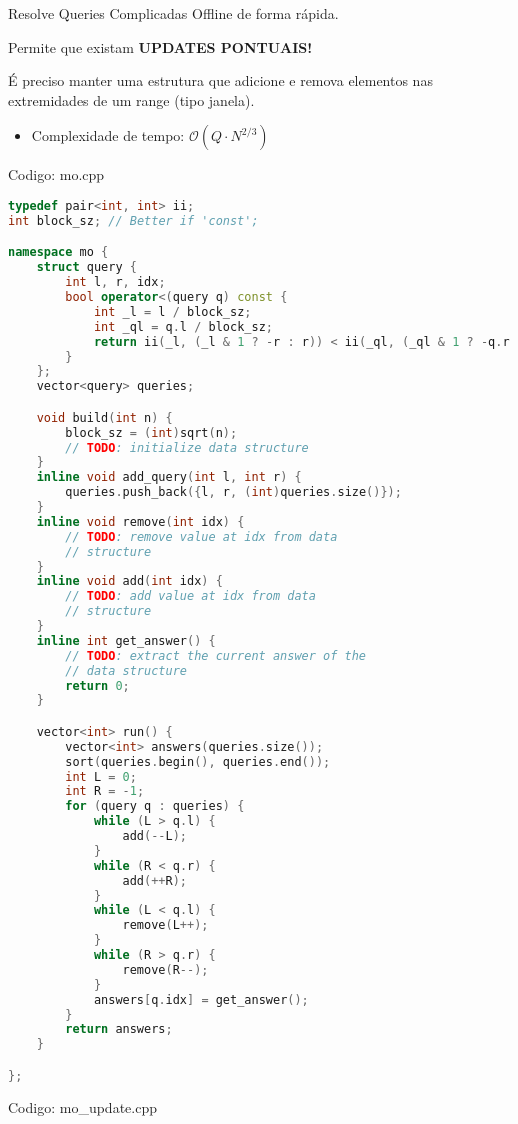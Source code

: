 \documentclass[10pt, a4paper, oneside]{book}
\begin{document}
Resolve Queries Complicadas Offline de forma rápida.   

Permite que existam \textbf{UPDATES PONTUAIS!}  

É preciso manter uma estrutura que adicione e remova elementos nas extremidades de um range (tipo janela).



\begin{itemize}
\item Complexidade de tempo: $\mathcal{O}(Q \cdot N^{2/3})$
\end{itemize}

\hfill

Codigo: mo.cpp

\begin{lstlisting}[language=C++]
typedef pair<int, int> ii;
int block_sz; // Better if 'const';

namespace mo {
    struct query {
        int l, r, idx;
        bool operator<(query q) const {
            int _l = l / block_sz;
            int _ql = q.l / block_sz;
            return ii(_l, (_l & 1 ? -r : r)) < ii(_ql, (_ql & 1 ? -q.r : q.r));
        }
    };
    vector<query> queries;

    void build(int n) {
        block_sz = (int)sqrt(n);
        // TODO: initialize data structure
    }
    inline void add_query(int l, int r) {
        queries.push_back({l, r, (int)queries.size()});
    }
    inline void remove(int idx) {
        // TODO: remove value at idx from data
        // structure
    }
    inline void add(int idx) {
        // TODO: add value at idx from data
        // structure
    }
    inline int get_answer() {
        // TODO: extract the current answer of the
        // data structure
        return 0;
    }

    vector<int> run() {
        vector<int> answers(queries.size());
        sort(queries.begin(), queries.end());
        int L = 0;
        int R = -1;
        for (query q : queries) {
            while (L > q.l) {
                add(--L);
            }
            while (R < q.r) {
                add(++R);
            }
            while (L < q.l) {
                remove(L++);
            }
            while (R > q.r) {
                remove(R--);
            }
            answers[q.idx] = get_answer();
        }
        return answers;
    }

};
\end{lstlisting}
\hfill

Codigo: mo\_update.cpp
\end{document}
